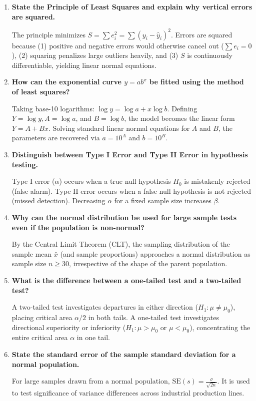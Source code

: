 \documentclass[12pt,a4paper]{article}
\newcommand{\Q}[1]{\textbf{#1}\par\noindent\ignorespaces}
\begin{document}
\begin{tcolorbox}[exambox, title={\textbf{Frequently Asked / Viva Questions}}]
\begin{enumerate}[topsep=0pt, label=\textbf{Q\arabic*.}, itemsep=5pt]
  \item \Q{State the Principle of Least Squares and explain why vertical errors are squared.}
  The principle minimizes $S = \sum e_i^2 = \sum (y_i - \hat{y}_i)^2$. Errors are squared because (1) positive and negative errors would otherwise cancel out ($\sum e_i = 0$), (2) squaring penalizes large outliers heavily, and (3) $S$ is continuously differentiable, yielding linear normal equations.

  \item \Q{How can the exponential curve $y = a b^x$ be fitted using the method of least squares?}
  Taking base-10 logarithms: $\log y = \log a + x \log b$. Defining $Y = \log y, A = \log a$, and $B = \log b$, the model becomes the linear form $Y = A + Bx$. Solving standard linear normal equations for $A$ and $B$, the parameters are recovered via $a = 10^A$ and $b = 10^B$.

  \item \Q{Distinguish between Type I Error and Type II Error in hypothesis testing.}
  Type I error ($\alpha$) occurs when a true null hypothesis $H_0$ is mistakenly rejected (false alarm). Type II error occurs when a false null hypothesis is not rejected (missed detection). Decreasing $\alpha$ for a fixed sample size increases $\beta$.

  \item \Q{Why can the normal distribution be used for large sample tests even if the population is non-normal?}
  By the Central Limit Theorem (CLT), the sampling distribution of the sample mean $\bar{x}$ (and sample proportions) approaches a normal distribution as sample size $n \ge 30$, irrespective of the shape of the parent population.

  \item \Q{What is the difference between a one-tailed test and a two-tailed test?}
  A two-tailed test investigates departures in either direction ($H_1: \mu \ne \mu_0$), placing critical area $\alpha/2$ in both tails. A one-tailed test investigates directional superiority or inferiority ($H_1: \mu > \mu_0$ or $\mu < \mu_0$), concentrating the entire critical area $\alpha$ in one tail.

  \item \Q{State the standard error of the sample standard deviation for a normal population.}
  For large samples drawn from a normal population, $\text{SE}(s) = \frac{\sigma}{\sqrt{2n}}$. It is used to test significance of variance differences across industrial production lines.


\end{enumerate}
\end{tcolorbox}
\end{document}
